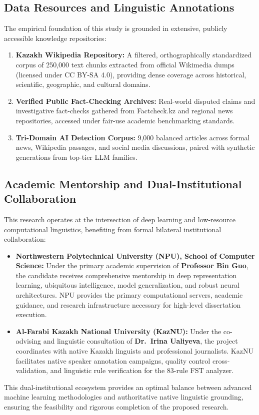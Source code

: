 \subsection{Data Resources and Linguistic Annotations}
The empirical foundation of this study is grounded in extensive, publicly accessible knowledge repositories:
\begin{enumerate}[leftmargin=*, label=(\arabic*)]
    \item \textbf{Kazakh Wikipedia Repository:} A filtered, orthographically standardized corpus of 250,000 text chunks extracted from official Wikimedia dumps (licensed under CC BY-SA 4.0), providing dense coverage across historical, scientific, geographic, and cultural domains.
    \item \textbf{Verified Public Fact-Checking Archives:} Real-world disputed claims and investigative fact-checks gathered from Factcheck.kz and regional news repositories, accessed under fair-use academic benchmarking standards.
    \item \textbf{Tri-Domain AI Detection Corpus:} 9,000 balanced articles across formal news, Wikipedia passages, and social media discussions, paired with synthetic generations from top-tier LLM families.
\end{enumerate}

\subsection{Academic Mentorship and Dual-Institutional Collaboration}
This research operates at the intersection of deep learning and low-resource computational linguistics, benefiting from formal bilateral institutional collaboration:
\begin{itemize}[leftmargin=*, label=$\diamond$]
    \item \textbf{Northwestern Polytechnical University (NPU), School of Computer Science:} Under the primary academic supervision of \textbf{Professor Bin Guo}, the candidate receives comprehensive mentorship in deep representation learning, ubiquitous intelligence, model generalization, and robust neural architectures. NPU provides the primary computational servers, academic guidance, and research infrastructure necessary for high-level dissertation execution.
    \item \textbf{Al-Farabi Kazakh National University (KazNU):} Under the co-advising and linguistic consultation of \textbf{Dr.\ Irina Ualiyeva}, the project coordinates with native Kazakh linguists and professional journalists. KazNU facilitates native speaker annotation campaigns, quality control cross-validation, and linguistic rule verification for the 83-rule FST analyzer.
\end{itemize}
This dual-institutional ecosystem provides an optimal balance between advanced machine learning methodologies and authoritative native linguistic grounding, ensuring the feasibility and rigorous completion of the proposed research.
